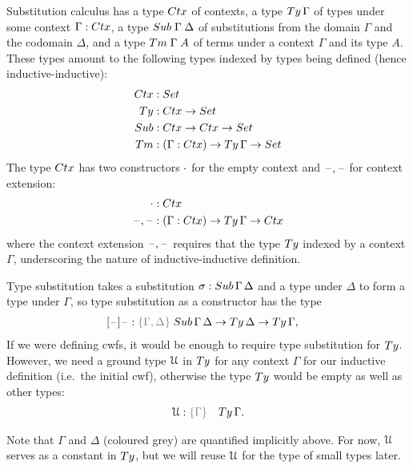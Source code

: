 \documentclass[a4paper,UKenglish,numberwithinsect,cleveref,thm-restate]{lipics-v2021}
\begin{document}
Substitution calculus has a type $\Ctx$ of contexts, a type $\Ty\,\Gamma$ of types under some context $\Gamma : \Ctx$, a type $\Sub\;\Gamma\;\Delta$ of substitutions from the domain $\Gamma$ and the codomain $\Delta$, and a type $\Tm\;\Gamma\;A$ of terms under a context $\Gamma$ and its type $A$. 
These types amount to the following types indexed by types being defined (hence inductive-inductive):
\begin{alignat*}{3}
  \Ctx   & : \Set                   \\
  \Ty    & : \Ctx \to \Set          \\
  \Sub   & : \Ctx \to \Ctx \to \Set \\
  \Tm    & : (\Gamma : \Ctx) \to \Ty\,\Gamma \to \Set
\end{alignat*}
The type $\Ctx$ has two constructors $\cdot$ for the empty context and $\mathord{\hspace{1pt}\text{--}\hspace{1pt}},\mathord{\hspace{1pt}\text{--}\hspace{1pt}}$ for context extension:
\begin{alignat*}{3}
  \emptyctx & : \Ctx \\
  \blank,\blank & : (\Gamma : \Ctx) \to \Ty\,\Gamma \to \Ctx
\end{alignat*}
where the context extension $\mathord{\hspace{1pt}\text{--}\hspace{1pt}},\mathord{\hspace{1pt}\text{--}\hspace{1pt}}$ requires that the type $\Ty$ indexed by a context $\Gamma$, underscoring the nature of inductive-inductive definition.

Type substitution takes a substitution $\sigma : \Sub\,\Gamma\,\Delta$ and a type under $\Delta$ to form a type under $\Gamma$, so type substitution as a constructor has the type
\begin{alignat*}{3}
  [\blank]\blank &: \implicit{\Gamma, \Delta} \; \Sub\,\Gamma\,\Delta \to \Ty\,\Delta \to \Ty\,\Gamma,
\end{alignat*}
If we were defining cwfs, it would be enough to require type substitution for $\Ty$.
However, we need a ground type $\mathcal{U}$ in $\Ty$ for any context $\Gamma$ for our inductive definition (i.e.\ the initial cwf), 
otherwise the type $\Ty$ would be empty as well as other types:
\begin{alignat*}{3}
  \UU & : \implicit{\Gamma} & \Ty\, \Gamma.
\end{alignat*}

Note that $\Gamma$ and $\Delta$ (coloured {\color{gray}grey}) are quantified implicitly above.
For now, $\mathcal{U}$ serves as a constant in $\Ty$, but we will reuse $\mathcal{U}$ for the type of small types later.
\end{document}
